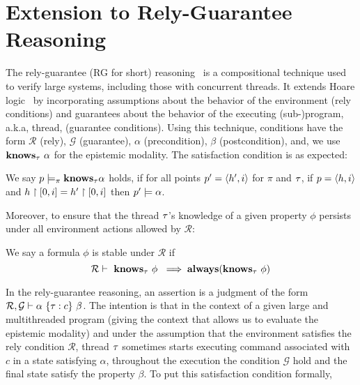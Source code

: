 \newcommand{\rely}{\mathcal{R}}
\newcommand{\guarantee}{\mathcal{G}}
\newcommand{\stable}{\mathbf{stable}}
\section{Extension to Rely-Guarantee Reasoning}
The rely-guarantee (RG for short) reasoning~\cite{DBLP:phd/ethos/Jones81} is a compositional technique used to verify large systems, including those with concurrent threads. It extends Hoare logic~\cite{DBLP:journals/cacm/Hoare69} by incorporating assumptions about the behavior of the environment (rely conditions) and guarantees about the behavior of the executing (sub-)program, a.k.a, thread, (guarantee conditions).
%
Using this technique, conditions have the form $\rely$ (rely), $\guarantee$ (guarantee), $\alpha$ (precondition), $\beta$ (postcondition), and, we use $\Knows_{\tid}\ \alpha$ for the epistemic modality. 
The satisfaction condition is as expected:

\begin{proposition}
We say $p \models_{\pi} \mathbf{knows}_{\tau}\alpha$ holds, if for all points $p' = \langle h',i \rangle$ for $\pi$ and $\tau$, if $p= \langle h,i\rangle$ and $h\upharpoonright [0,i] = h'\upharpoonright [0,i]$ then $p' \models \alpha$.
\end{proposition}

Moreover, to ensure that the thread $\tau$'s  knowledge of a given property $\phi$ persists under all environment actions allowed by $\rely$:
\begin{definition}
We say a formula $\phi$ is stable under $\rely$ if 
\[
\rely \vdash\ \Knows_{\tid}\ \phi\ \implies \Always(\Knows_{\tid}\ \phi)
\]
\end{definition}

In the rely-guarantee reasoning, an assertion is a judgment of the form $\rely,\guarantee \vdash \alpha\ \{\tid:c\}\ \beta$. The intention is that in the context of a given large and multithreaded program (giving the context that allows us to evaluate the epistemic modality) and under the assumption that the environment satisfies the rely condition $\rely$, thread $\tau$ sometimes starts executing command associated with $c$ in a state satisfying $\alpha$, throughout the execution the condition $\guarantee$ hold and the final state satisfy the property $\beta$.
%
%
To put this satisfaction condition formally,

